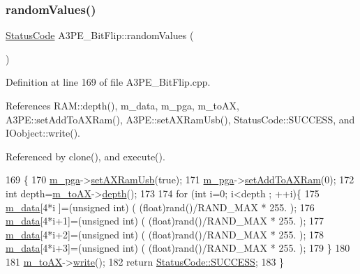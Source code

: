 \subsubsection{\texorpdfstring{random\+Values()}{randomValues()}}
{\footnotesize\ttfamily \hyperlink{classStatusCode}{Status\+Code} A3\+P\+E\+\_\+\+Bit\+Flip\+::random\+Values (\begin{DoxyParamCaption}{ }\end{DoxyParamCaption})\hspace{0.3cm}{\ttfamily [protected]}}



Definition at line 169 of file A3\+P\+E\+\_\+\+Bit\+Flip.\+cpp.



References R\+A\+M\+::depth(), m\+\_\+data, m\+\_\+pga, m\+\_\+to\+AX, A3\+P\+E\+::set\+Add\+To\+A\+X\+Ram(), A3\+P\+E\+::set\+A\+X\+Ram\+Usb(), Status\+Code\+::\+S\+U\+C\+C\+E\+SS, and I\+Oobject\+::write().



Referenced by clone(), and execute().


\begin{DoxyCode}
169                                        \{
170   \hyperlink{classA3PE__BitFlip_ad20d7abccf27fa87b931cb77cd6b5e41}{m\_pga}->\hyperlink{classA3PE_a77ccfbd9df2fad96a9a9f1dc579a7a2d}{setAXRamUsb}(\textcolor{keyword}{true});
171   \hyperlink{classA3PE__BitFlip_ad20d7abccf27fa87b931cb77cd6b5e41}{m\_pga}->\hyperlink{classA3PE_a54fe4da570ea8833fe2c981de1085387}{setAddToAXRam}(0);
172   \textcolor{keywordtype}{int} depth=\hyperlink{classA3PE__BitFlip_a0ac416167c83d423cda4e09a892b5255}{m\_toAX}->\hyperlink{classRAM_aa36cbedb8a970a01ee07a9637553887f}{depth}();
173 
174   \textcolor{keywordflow}{for} (\textcolor{keywordtype}{int} i=0; i<depth ; ++i)\{
175     \hyperlink{classA3PE__BitFlip_a06e7c01e11710261168bb0e12e2e4ac5}{m\_data}[4*i  ]=(\textcolor{keywordtype}{unsigned} int) ( (\textcolor{keywordtype}{float})rand()/RAND\_MAX * 255. );
176     \hyperlink{classA3PE__BitFlip_a06e7c01e11710261168bb0e12e2e4ac5}{m\_data}[4*i+1]=(\textcolor{keywordtype}{unsigned} int) ( (\textcolor{keywordtype}{float})rand()/RAND\_MAX * 255. );
177     \hyperlink{classA3PE__BitFlip_a06e7c01e11710261168bb0e12e2e4ac5}{m\_data}[4*i+2]=(\textcolor{keywordtype}{unsigned} int) ( (\textcolor{keywordtype}{float})rand()/RAND\_MAX * 255. );
178     \hyperlink{classA3PE__BitFlip_a06e7c01e11710261168bb0e12e2e4ac5}{m\_data}[4*i+3]=(\textcolor{keywordtype}{unsigned} int) ( (\textcolor{keywordtype}{float})rand()/RAND\_MAX * 255. );
179   \}
180 
181   \hyperlink{classA3PE__BitFlip_a0ac416167c83d423cda4e09a892b5255}{m\_toAX}->\hyperlink{classIOobject_a9f6984bc9f0fadcf800f1be2523ac744}{write}();
182   \textcolor{keywordflow}{return} \hyperlink{classStatusCode_a6f565cbeadc76d14c72f047e5e85eb4badd0da38d3ba0d922efd1f4619bc37ad8}{StatusCode::SUCCESS};
183 \}
\end{DoxyCode}
\mbox{\label{classA3PE__BitFlip_a079d34acd89f699395a9bbf6b4918205}} 
